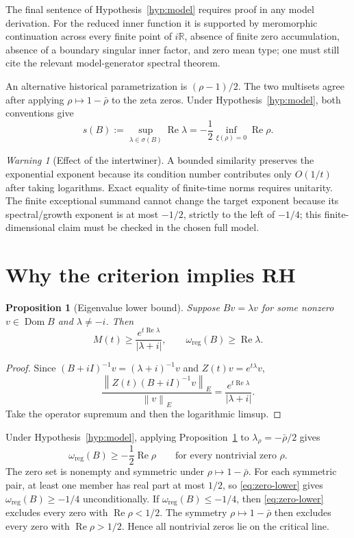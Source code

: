 \documentclass[11pt]{amsart}
\newtheorem{proposition}[theorem]{Proposition}
\theoremstyle{definition}
\theoremstyle{remark}
\newtheorem{warning}[theorem]{Warning}
\DeclareMathOperator{\Dom}{Dom}
\DeclareMathOperator{\Repart}{Re}
\newcommand{\R}{\mathbb R}
\newcommand{\norm}[1]{\left\lVert #1\right\rVert}
\begin{document}
The final sentence of Hypothesis~\ref{hyp:model} requires proof in any model
derivation.  For the reduced inner function it is supported by meromorphic
continuation across every finite point of $i\R$, absence of finite zero
accumulation, absence of a boundary singular inner factor, and zero mean type;
one must still cite the relevant model-generator spectral theorem.

An alternative historical parametrization is $(\rho-1)/2$.  The two multisets
agree after applying $\rho\mapsto1-\bar\rho$ to the zeta zeros.  Under
Hypothesis~\ref{hyp:model}, both conventions give
\begin{equation}\label{eq:spectral-bound}
 s(B):=\sup_{\lambda\in\sigma(B)}\Repart\lambda
 =-\frac12\inf_{\xi(\rho)=0}\Repart\rho.
\end{equation}

\begin{warning}[Effect of the intertwiner]
A bounded similarity preserves the exponential exponent because its condition
number contributes only $O(1/t)$ after taking logarithms.  Exact equality of
finite-time norms requires unitarity.  The finite exceptional summand cannot
change the target exponent because its spectral/growth exponent is at most
$-1/2$, strictly to the left of $-1/4$; this finite-dimensional claim must be
checked in the chosen full model.
\end{warning}

\section{Why the criterion implies RH}\label{sec:easy}

\begin{proposition}[Eigenvalue lower bound]\label{prop:eigen-lower}
Suppose $Bv=\lambda v$ for some nonzero $v\in\Dom B$ and
$\lambda\neq-i$.  Then
\[
 M(t)\geq\frac{e^{t\Repart\lambda}}{|\lambda+i|},
 \qquad
 \omega_{\mathrm{reg}}(B)\geq\Repart\lambda.
\]
\end{proposition}

\begin{proof}
Since $(B+iI)^{-1}v=(\lambda+i)^{-1}v$ and
$Z(t)v=e^{t\lambda}v$,
\[
 \frac{\norm{Z(t)(B+iI)^{-1}v}_{E}}{\norm{v}_{E}}
 =\frac{e^{t\Repart\lambda}}{|\lambda+i|}.
\]
Take the operator supremum and then the logarithmic limsup.
\end{proof}

Under Hypothesis~\ref{hyp:model}, applying
Proposition~\ref{prop:eigen-lower} to
$\lambda_{\rho}=-\bar\rho/2$ gives
\begin{equation}\label{eq:zero-lower}
 \omega_{\mathrm{reg}}(B)\geq-\frac12\Repart\rho
 \qquad\text{for every nontrivial zero $\rho$.}
\end{equation}
The zero set is nonempty and symmetric under
$\rho\mapsto1-\bar\rho$.  For each symmetric pair, at least one member has
real part at most $1/2$, so \eqref{eq:zero-lower} gives
$\omega_{\mathrm{reg}}(B)\geq-1/4$ unconditionally.  If
$\omega_{\mathrm{reg}}(B)\leq-1/4$, then \eqref{eq:zero-lower} excludes
every zero with $\Repart\rho<1/2$.  The symmetry
$\rho\mapsto1-\bar\rho$ then excludes every zero with
$\Repart\rho>1/2$.  Hence all nontrivial zeros lie on the critical line.
\end{document}
